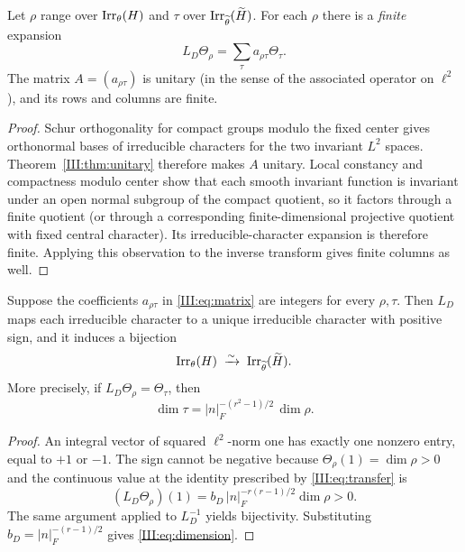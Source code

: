 \begin{corollary}\label{III:cor:matrix}
Let $\rho$ range over $\operatorname{Irr}_\theta(H)$ and $\tau$ over $\operatorname{Irr}_{\widetilde\theta}(\widetilde H)$. For each $\rho$ there is a \emph{finite} expansion
\begin{equation}\label{III:eq:matrix}
L_D\Theta_\rho=\sum_{\tau}a_{\rho\tau}\Theta_\tau.
\end{equation}
The matrix $A=(a_{\rho\tau})$ is unitary (in the sense of the associated operator on $\ell^2$), and its rows and columns are finite.
\end{corollary}
\begin{proof}
Schur orthogonality for compact groups modulo the fixed center gives orthonormal bases of irreducible characters for the two invariant $L^2$ spaces. Theorem~\ref{III:thm:unitary} therefore makes $A$ unitary. Local constancy and compactness modulo center show that each smooth invariant function is invariant under an open normal subgroup of the compact quotient, so it factors through a finite quotient (or through a corresponding finite-dimensional projective quotient with fixed central character). Its irreducible-character expansion is therefore finite. Applying this observation to the inverse transform gives finite columns as well.
\end{proof}

\begin{corollary}\label{III:cor:integrality}
Suppose the coefficients $a_{\rho\tau}$ in \eqref{III:eq:matrix} are integers for every $\rho,\tau$. Then $L_D$ maps each irreducible character to a unique irreducible character with positive sign, and it induces a bijection
\[
\operatorname{Irr}_\theta(H)\;\xrightarrow{\sim}\;\operatorname{Irr}_{\widetilde\theta}(\widetilde H).
\]
More precisely, if $L_D\Theta_\rho=\Theta_\tau$, then
\begin{equation}\label{III:eq:dimension}
\boxed{\qquad\dim\tau=|n|_F^{-(r^2-1)/2}\,\dim\rho.\qquad}
\end{equation}
\end{corollary}
\begin{proof}
An integral vector of squared $\ell^2$-norm one has exactly one nonzero entry, equal to $+1$ or $-1$. The sign cannot be negative because $\Theta_\rho(1)=\dim\rho>0$ and the continuous value at the identity prescribed by \eqref{III:eq:transfer} is
\[
(L_D\Theta_\rho)(1)
=b_D\,|n|_F^{-r(r-1)/2}\dim\rho>0.
\]
The same argument applied to $L_D^{-1}$ yields bijectivity. Substituting $b_D=|n|_F^{-(r-1)/2}$ gives \eqref{III:eq:dimension}.
\end{proof}

